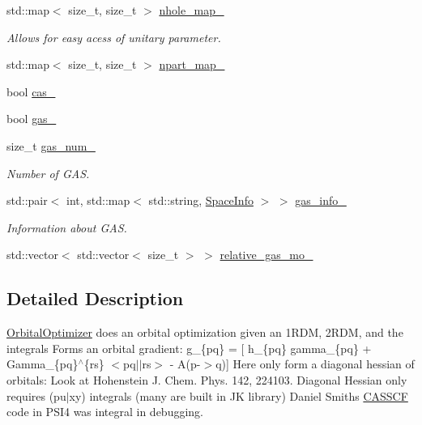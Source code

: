 \begin{DoxyCompactItemize}
std\+::map$<$ size\+\_\+t, size\+\_\+t $>$ \mbox{\hyperlink{classforte_1_1_orbital_optimizer_a02903cd2951117b676cc97ee08f0195b}{nhole\+\_\+map\+\_\+}}
\begin{DoxyCompactList}\small\item\em Allows for easy acess of unitary parameter. \end{DoxyCompactList}\item 
std\+::map$<$ size\+\_\+t, size\+\_\+t $>$ \mbox{\hyperlink{classforte_1_1_orbital_optimizer_a7a33745ae709fa5b9f6526953cab5dd6}{npart\+\_\+map\+\_\+}}
\item 
bool \mbox{\hyperlink{classforte_1_1_orbital_optimizer_a07ad28a17d65606647385d34beee2f8b}{cas\+\_\+}}
\item 
bool \mbox{\hyperlink{classforte_1_1_orbital_optimizer_a2d4df88496cd9b9cf1403df2c74625b2}{gas\+\_\+}}
\item 
size\+\_\+t \mbox{\hyperlink{classforte_1_1_orbital_optimizer_ad9b7a552ab9d5def3d94fab7c61d225a}{gas\+\_\+num\+\_\+}}
\begin{DoxyCompactList}\small\item\em Number of G\+AS. \end{DoxyCompactList}\item 
std\+::pair$<$ int, std\+::map$<$ std\+::string, \mbox{\hyperlink{namespaceforte_a5409f5af2d60d63681bfac1017b8e226}{Space\+Info}} $>$ $>$ \mbox{\hyperlink{classforte_1_1_orbital_optimizer_ab2b2a1ccb10976a2557221f7f22cb0ad}{gas\+\_\+info\+\_\+}}
\begin{DoxyCompactList}\small\item\em Information about G\+AS. \end{DoxyCompactList}\item 
std\+::vector$<$ std\+::vector$<$ size\+\_\+t $>$ $>$ \mbox{\hyperlink{classforte_1_1_orbital_optimizer_a79432eda78baba3dbd70983e5cd6db58}{relative\+\_\+gas\+\_\+mo\+\_\+}}
\end{DoxyCompactItemize}


\subsection{Detailed Description}
\mbox{\hyperlink{classforte_1_1_orbital_optimizer}{Orbital\+Optimizer}} does an orbital optimization given an 1\+R\+DM, 2\+R\+DM, and the integrals Forms an orbital gradient\+: g\+\_\+\{pq\} = \mbox{[} h\+\_\+\{pq\} gamma\+\_\+\{pq\} + Gamma\+\_\+\{pq\}$^\wedge$\{rs\} $<$pq$\vert$$\vert$rs$>$ -\/ A(p-\/$>$q)\mbox{]} Here only form a diagonal hessian of orbitals\+: Look at Hohenstein J. Chem. Phys. 142, 224103. Diagonal Hessian only requires (pu$\vert$xy) integrals (many are built in JK library) Daniel Smith\textquotesingle{}s \mbox{\hyperlink{classforte_1_1_c_a_s_s_c_f}{C\+A\+S\+S\+CF}} code in P\+S\+I4 was integral in debugging. 

